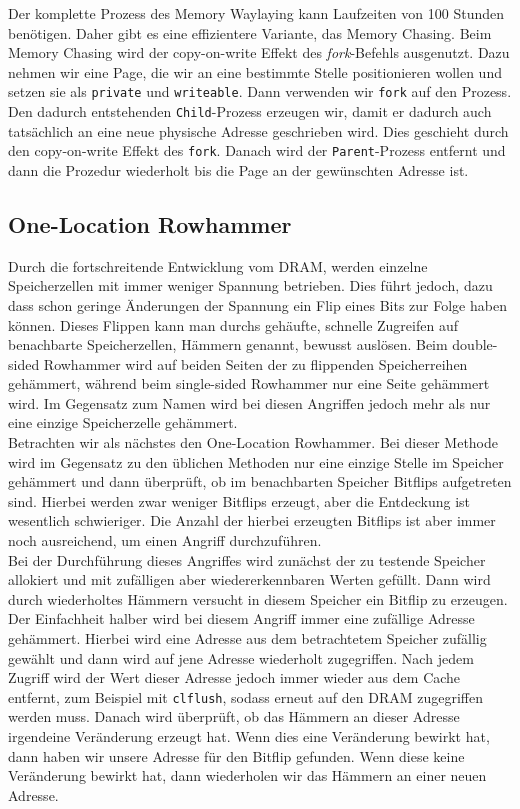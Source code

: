 \documentclass[conference]{IEEEtran}
\begin{document}
Der komplette Prozess des Memory Waylaying kann Laufzeiten von 100 Stunden benötigen. Daher gibt es eine effizientere Variante, das Memory Chasing. Beim Memory Chasing wird der copy-on-write Effekt des \textit{fork}-Befehls ausgenutzt. Dazu nehmen wir eine Page, die wir an eine bestimmte Stelle positionieren wollen und setzen sie als \texttt{private} und \texttt{writeable}. Dann verwenden wir \texttt{fork} auf den Prozess. Den dadurch entstehenden \texttt{Child}-Prozess erzeugen wir, damit er dadurch auch tatsächlich an eine neue physische Adresse geschrieben wird. Dies geschieht durch den copy-on-write Effekt des \texttt{fork}. Danach wird der \texttt{Parent}-Prozess entfernt und dann die Prozedur wiederholt bis die Page an der gewünschten Adresse ist.\\

\subsection{One-Location Rowhammer}
Durch die fortschreitende Entwicklung vom DRAM, werden einzelne Speicherzellen mit immer weniger Spannung betrieben. Dies führt jedoch, dazu dass schon geringe Änderungen der Spannung ein Flip eines Bits zur Folge haben können. Dieses Flippen kann man durchs gehäufte, schnelle Zugreifen auf benachbarte Speicherzellen, Hämmern genannt, bewusst auslösen.
 Beim double-sided Rowhammer wird auf beiden Seiten der zu flippenden Speicherreihen gehämmert, während beim single-sided Rowhammer nur eine Seite gehämmert wird. Im Gegensatz zum Namen wird bei diesen Angriffen jedoch mehr als nur eine einzige Speicherzelle gehämmert.\\
Betrachten wir als nächstes den One-Location Rowhammer. Bei dieser Methode wird im Gegensatz zu den üblichen Methoden nur eine einzige Stelle im Speicher gehämmert und dann überprüft, ob im benachbarten Speicher Bitflips aufgetreten sind. Hierbei werden zwar weniger Bitflips erzeugt, aber die Entdeckung ist wesentlich schwieriger. Die Anzahl der hierbei erzeugten Bitflips ist aber immer noch ausreichend, um einen Angriff durchzuführen.\\
Bei der Durchführung dieses Angriffes wird zunächst der zu testende Speicher allokiert und mit zufälligen aber wiedererkennbaren Werten gefüllt. Dann wird durch wiederholtes Hämmern versucht in diesem Speicher ein Bitflip zu erzeugen. Der Einfachheit halber wird bei diesem Angriff immer eine zufällige Adresse gehämmert. Hierbei wird eine Adresse aus dem betrachtetem Speicher zufällig gewählt und dann wird auf jene Adresse wiederholt zugegriffen. Nach jedem Zugriff wird der Wert dieser Adresse jedoch immer wieder aus dem Cache entfernt, zum Beispiel mit \texttt{clflush}, sodass erneut auf den DRAM zugegriffen werden muss. Danach wird überprüft, ob das Hämmern an dieser Adresse irgendeine Veränderung erzeugt hat. Wenn dies eine Veränderung bewirkt hat, dann haben wir unsere Adresse für den Bitflip gefunden. Wenn diese keine Veränderung bewirkt hat, dann wiederholen wir das Hämmern an einer neuen Adresse.\\
\end{document}
